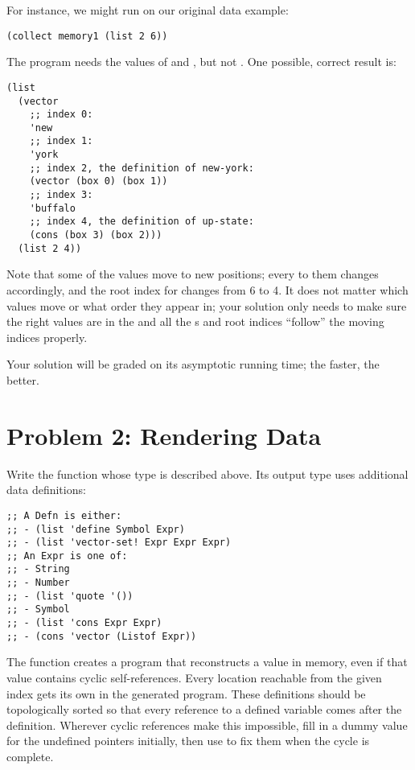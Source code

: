\documentclass{article}
\begin{document}
For instance, we might run  on our original data example:
\begin{verbatim}
(collect memory1 (list 2 6))
\end{verbatim}
The program needs the values of  and , but not
.  One possible, correct result is:
\begin{verbatim}
(list
  (vector
    ;; index 0:
    'new
    ;; index 1:
    'york
    ;; index 2, the definition of new-york:
    (vector (box 0) (box 1))
    ;; index 3:
    'buffalo
    ;; index 4, the definition of up-state:
    (cons (box 3) (box 2)))
  (list 2 4))
\end{verbatim}
Note that some of the values move to new positions; every  to them
changes accordingly, and the root index for  changes from 6 to 4.
It does not matter which values move or what order they appear in; your solution
only needs to make sure the right values are in the  and all the
s and root indices ``follow'' the moving indices properly.

\medskip

Your solution will be graded on its asymptotic running time; the faster, the
better.

\newpage
\section{Problem 2: Rendering Data}


Write the function  whose type is described above.  Its output
type uses additional data definitions:

\begin{verbatim}
;; A Defn is either:
;; - (list 'define Symbol Expr)
;; - (list 'vector-set! Expr Expr Expr)
;; An Expr is one of:
;; - String
;; - Number
;; - (list 'quote '())
;; - Symbol
;; - (list 'cons Expr Expr)
;; - (cons 'vector (Listof Expr))
\end{verbatim}

The function  creates a program that reconstructs a value in
memory, even if that value contains cyclic self-references.  Every location
reachable from the given index gets its own  in the generated
program.  These definitions should be topologically sorted so that every
reference to a defined variable comes after the definition.  Wherever cyclic
references make this impossible, fill in a dummy value for the undefined
pointers initially, then use  to fix them when the cycle is
complete.
\end{document}
